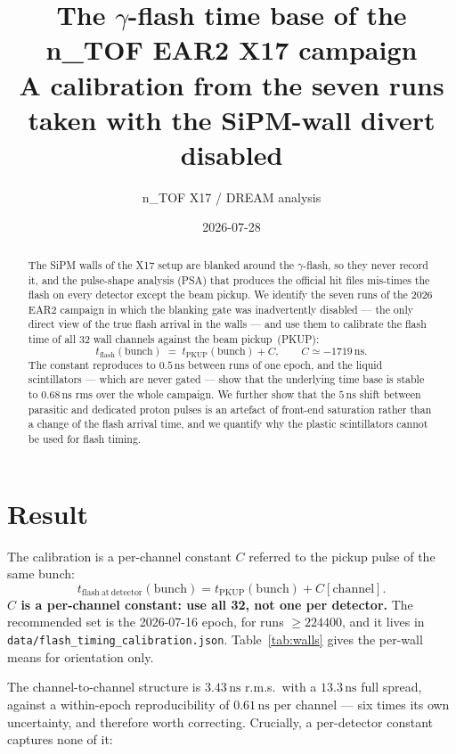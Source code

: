 \documentclass[11pt,a4paper]{article}
\title{\bfseries The $\gamma$-flash time base of the n\_TOF EAR2 X17 campaign\\
\large A calibration from the seven runs taken with the SiPM-wall divert disabled}
\author{n\_TOF X17 / DREAM analysis}
\date{2026-07-28}
\newcommand{\ns}{\,\mathrm{ns}}
\begin{document}
\maketitle

\begin{abstract}
\noindent
The SiPM walls of the X17 setup are blanked around the $\gamma$-flash, so they
never record it, and the pulse-shape analysis (PSA) that produces the official
hit files mis-times the flash on every detector except the beam pickup. We
identify the seven runs of the 2026 EAR2 campaign in which the blanking gate was
inadvertently disabled --- the only direct view of the true flash arrival in the
walls --- and use them to calibrate the flash time of all 32 wall channels
against the beam pickup~(PKUP):
\[
   t_\mathrm{flash}(\text{bunch}) \;=\; t_\mathrm{PKUP}(\text{bunch}) + C ,
   \qquad C \simeq -1719\ns .
\]
The constant reproduces to $0.5\ns$ between runs of one epoch, and the liquid
scintillators --- which are never gated --- show that the underlying time base
is stable to $0.68\ns$ rms over the whole campaign. We further show that the
$5\ns$ shift between parasitic and dedicated proton pulses is an artefact of
front-end saturation rather than a change of the flash arrival time, and we
quantify why the plastic scintillators cannot be used for flash timing.
\end{abstract}

\section{Result}

The calibration is a per-channel constant $C$ referred to the pickup pulse of
the same bunch:
\begin{equation}
   t_\mathrm{flash\ at\ detector}(\text{bunch}) = t_\mathrm{PKUP}(\text{bunch}) + C[\text{channel}] .
   \label{eq:cal}
\end{equation}
\textbf{$C$ is a per-channel constant: use all 32, not one per detector.} The
recommended set is the 2026-07-16 epoch, for runs $\geq 224400$, and it lives in
\texttt{data/flash\_timing\_calibration.json}. Table~\ref{tab:walls} gives the
per-wall means for orientation only.

The channel-to-channel structure is $3.43\ns$ r.m.s.\ with a $13.3\ns$ full
spread, against a within-epoch reproducibility of $0.61\ns$ per channel --- six
times its own uncertainty, and therefore worth correcting. Crucially, a
per-detector constant captures none of it:
\end{document}
